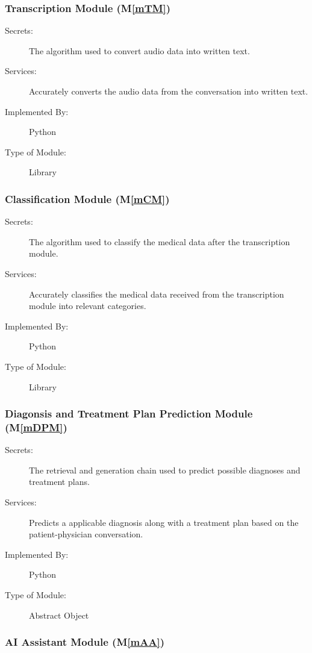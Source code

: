 \documentclass[12pt, titlepage]{article}
\newcommand{\mref}[1]{M\ref{#1}}
\begin{document}
\subsubsection{Transcription Module (\mref{mTM})}

\begin{description}
\item[Secrets:]The algorithm used to convert audio data into written text.
\item[Services:]Accurately converts the audio data from the conversation into written text.   
\item[Implemented By:]Python
\item[Type of Module:]Library
\end{description}

\subsubsection{Classification Module (\mref{mCM})}

\begin{description}
\item[Secrets:]The algorithm used to classify the medical data after the transcription module.
\item[Services:]Accurately classifies the medical data received from the transcription module into relevant categories.
\item[Implemented By:]Python
\item[Type of Module:]Library
\end{description}

\subsubsection{Diagonsis and Treatment Plan Prediction Module (\mref{mDPM})}

\begin{description}
\item[Secrets:]The retrieval and generation chain used to predict possible diagnoses and treatment plans.
\item[Services:]Predicts a applicable diagnosis along with a treatment plan based on the patient-physician conversation.
\item[Implemented By:]Python
\item[Type of Module:]Abstract Object
\end{description}

\subsubsection{AI Assistant Module (\mref{mAA})}
\end{document}
